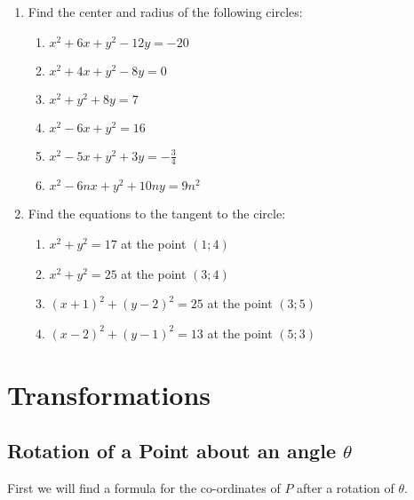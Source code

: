 {\begin{enumerate}
\item Find the center and radius of the following circles: 
\begin{enumerate} 
\item $ x^2 + 6x + y^2 - 12y = -20 $ 
\item $ x^2 + 4x + y^2 - 8y = 0 $ 
\item $ x^2 + y^2 + 8y = 7 $ 
\item $ x^2 - 6x + y^2 = 16 $ 
\item $ x^2 - 5x + y^2 + 3y = -\frac{3}{4} $ 
\item $ x^2 - 6nx + y^2 + 10ny = 9n^2 $ 
\end{enumerate} 

\item Find the equations to the tangent to the circle: 
\begin{enumerate} 
\item $ x^2 + y^2 = 17 $ at the point $(1;4)$ 
\item $ x^2 + y^2 = 25 $ at the point $(3;4)$ 
\item $ (x+1)^2 + (y-2)^2 = 25 $ at the point $(3;5)$ 
\item $ (x-2)^2 + (y-1)^2 = 13 $ at the point $(5;3)$ 
\end{enumerate} 
\end{enumerate}
}

\section{Transformations}

\subsection{Rotation of a Point about an angle $\theta$}

First we will find a formula for the co-ordinates of $P$ after a rotation of $\theta$.\\

